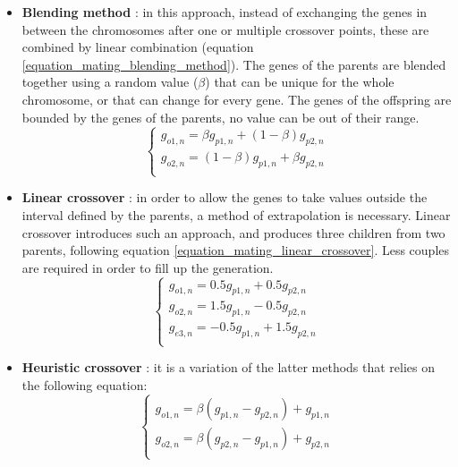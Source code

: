 \documentclass[twocol]{ametsoc}
\begin{document}
\begin{itemize}
	\item \textbf{Blending method} \citep{Radcliffe1991a}: in this approach, instead of exchanging the genes in between the chromosomes after one or multiple crossover points, these are combined by linear combination (equation \ref{equation_mating_blending_method}). The genes of the parents are blended together using a random value ($\beta$) that can be unique for the whole chromosome, or that can change for every gene. The genes of the offspring are bounded by the genes of the parents, no value can be out of their range.
	\begin{equation}
	\left\lbrace \begin{array}{l} 
	g_{o1,n} = \beta g_{p1,n} + (1-\beta)g_{p2,n} \\ 
	g_{o2,n} = (1-\beta) g_{p1,n} + \beta g_{p2,n} \\
	\end{array} \right.
	\label{equation_mating_blending_method}
	\end{equation}
	
	\item \textbf{Linear crossover} \citep{Wright1991a}: in order to allow the genes to take values outside the interval defined by the parents, a method of extrapolation is necessary. Linear crossover introduces such an approach, and produces three children from two parents, following equation \ref{equation_mating_linear_crossover}. Less couples are required in order to fill up the generation.
	\begin{equation}
	\left\lbrace \begin{array}{l} 
	g_{o1,n} = 0.5 g_{p1,n} + 0.5 g_{p2,n} \\ 
	g_{o2,n} = 1.5 g_{p1,n} - 0.5 g_{p2,n} \\ 
	g_{e3,n} = - 0.5 g_{p1,n} + 1.5 g_{p2,n} \\ 
	\end{array} \right.
	\label{equation_mating_linear_crossover}
	\end{equation}
	
	\item \textbf{Heuristic crossover} \citep{Michalewicz1996}: it is a variation of the latter methods that relies on the following equation:
	\begin{equation}
	\left\lbrace \begin{array}{l} 
	g_{o1,n} = \beta (g_{p1,n} - g_{p2,n}) + g_{p1,n} \\
	g_{o2,n} = \beta (g_{p2,n} - g_{p1,n}) + g_{p2,n} \\
	\end{array} \right.
	\label{equation_mating_heuristic_crossover}
	\end{equation}
	

\end{itemize}
\end{document}
